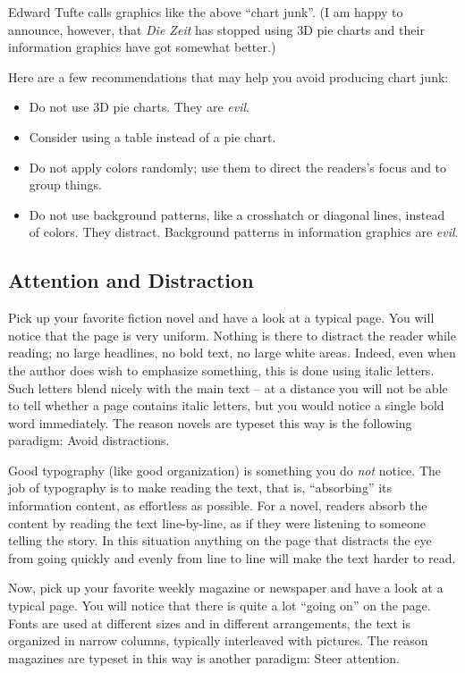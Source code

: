 %
Edward Tufte calls graphics like the above ``chart junk''. (I am happy to
announce, however, that \emph{Die Zeit} has stopped using 3D pie charts and
their information graphics have got somewhat better.)

Here are a few recommendations that may help you avoid producing chart junk:
%
\begin{itemize}
    \item Do not use 3D pie charts. They are \emph{evil}.
    \item Consider using a table instead of a pie chart.
    \item Do not apply colors randomly; use them to direct the readers's
        focus and to group things.
    \item Do not use background patterns, like a crosshatch or diagonal
        lines, instead of colors. They distract. Background patterns in
        information graphics are \emph{evil}.
\end{itemize}


\subsection{Attention and Distraction}

Pick up your favorite fiction novel and have a look at a typical page. You will
notice that the page is very uniform. Nothing is there to distract the reader
while reading; no large headlines, no bold text, no large white areas. Indeed,
even when the author does wish to emphasize something, this is done using
italic letters. Such letters blend nicely with the main text -- at a distance
you will not be able to tell whether a page contains italic letters, but you
would notice a single bold word immediately. The reason novels are typeset this
way is the following paradigm: Avoid distractions.

Good typography (like good organization) is something you do \emph{not} notice.
The job of typography is to make reading the text, that is, ``absorbing'' its
information content, as effortless as possible. For a novel, readers absorb the
content by reading the text line-by-line, as if they were listening to someone
telling the story. In this situation anything on the page that distracts the
eye from  going quickly and evenly from line to line will make the text harder
to read.

Now, pick up your favorite weekly magazine or newspaper and have a look at a
typical page. You will notice that there is quite a lot ``going on'' on the
page. Fonts are used at different sizes and in different arrangements, the text
is organized in narrow columns, typically interleaved with pictures. The reason
magazines are typeset in this way is another paradigm: Steer attention.

